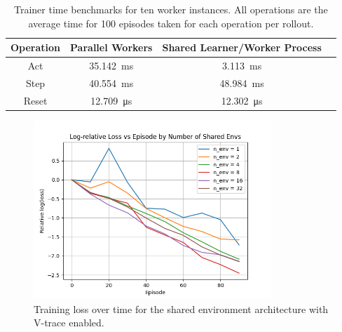 \begin{table}[h!]
    \centering
    \begin{tabular}{|c|c|c|c|}
        \hline
        \textbf{Operation} & \textbf{Parallel Workers} & \textbf{Shared Learner/Worker Process} \\
        \hline

        Act & \SI{35.142}{\milli\second} & \SI{3.113}{\milli\second} \\
        Step & \SI{40.554}{\milli\second} &\SI{48.984}{\milli\second} \\
        Reset & \SI{12.709}{\micro\second} & \SI{12.302}{\micro\second} \\
        \hline
    \end{tabular}
    \caption{Trainer time benchmarks for ten worker instances. All operations are the average time for 100 episodes taken for each operation per rollout.}
    \label{tab:benchmarks}
\end{table}


\begin{figure}
    \centering
    \includegraphics[width=0.8\textwidth]{images/results/loss_episode}
    \caption{Training loss over time for the shared environment architecture with V-trace enabled.}
    \label{fig:loss}
\end{figure}

